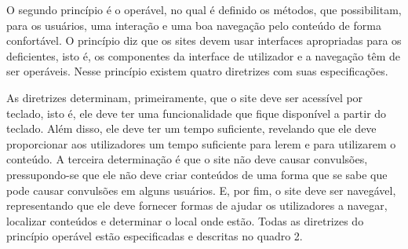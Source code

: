 \documentclass[a4paper]{article}
\begin{document}
\begin{titlepage}
O segundo princípio é o operável, no qual é definido os métodos, que possibilitam, para os usuários, uma interação e uma boa navegação pelo conteúdo de forma confortável. O princípio diz que os sites devem usar interfaces apropriadas para os deficientes, isto é, os componentes da interface de utilizador e a navegação têm de ser operáveis. Nesse princípio existem quatro diretrizes com suas especificações.

As diretrizes determinam, primeiramente, que o site deve ser acessível por teclado, isto é, ele deve ter uma funcionalidade que fique disponível a partir do teclado. Além disso, ele deve ter um tempo suficiente, revelando que ele deve proporcionar aos utilizadores um tempo suficiente para lerem e para utilizarem o conteúdo. A terceira determinação é que o site não deve causar convulsões, pressupondo-se que ele não deve criar conteúdos de uma forma que se sabe que pode causar convulsões em alguns usuários. E, por fim, o site deve ser navegável, representando que ele deve fornecer formas de ajudar os utilizadores a navegar, localizar conteúdos e determinar o local onde estão. Todas as diretrizes do princípio operável estão especificadas e descritas no quadro 2.\\


\end{titlepage}
\end{document}
